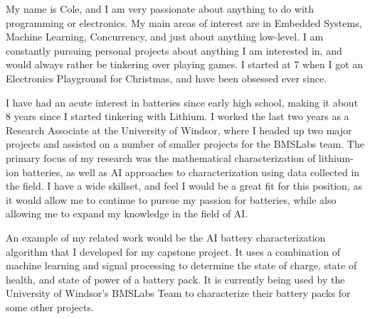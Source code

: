 
My name is Cole, and I am very passionate about anything to do with programming or electronics. My main areas of interest are in Embedded Systems, Machine Learning, Concurrency, and just about anything low-level. I am constantly pursuing personal projects about anything I am interested in, and would always rather be tinkering over playing games. I started at 7 when I got an Electronics Playground for Christmas, and have been obsessed ever since.

I have had an acute interest in batteries since early high school, making it about 8 years since I started tinkering with Lithium. I worked the last two years as a Research Associate at the University of Windsor, where I headed up two major projects and assisted on a number of smaller projects for the BMSLabs team. The primary focus of my research was the mathematical characterization of lithium-ion batteries, as well as AI approaches to characterization using data collected in the field. I have a wide skillset, and feel I would be a great fit for this position, as it would allow me to continue to pursue my passion for batteries, while also allowing me to expand my knowledge in the field of AI.

An example of my related work would be the AI battery characterization algorithm that I developed for my capstone project. It uses a combination of machine learning and signal processing to determine the state of charge, state of health, and state of power of a battery pack. It is currently being used by the University of Windsor's BMSLabs Team to characterize their battery packs for some other projects.